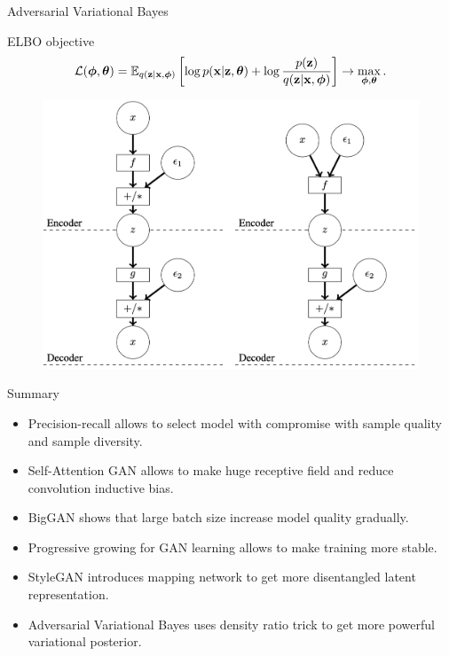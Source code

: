 \begin{frame}{Adversarial Variational Bayes}
	\begin{block}{ELBO objective}
		\vspace{-0.5cm}
		\[
			 \mathcal{L} (\boldsymbol{\phi}, \boldsymbol{\theta})  = \mathbb{E}_{q(\mathbf{z} | \mathbf{x}, \boldsymbol{\phi})} \left[\log p(\mathbf{x} | \mathbf{z}, \boldsymbol{\theta}) + \log \frac{p(\mathbf{z})}{q(\mathbf{z}| \mathbf{x}, \boldsymbol{\phi})} \right] \rightarrow \max_{\boldsymbol{\phi}, \boldsymbol{\theta}}.
		\]	
		\vspace{-0.5cm}
	\end{block}
	\begin{figure}
		\includegraphics[width=0.7\linewidth]{figs/avb_scheme}
	\end{figure}
\end{frame}
\begin{frame}{Summary}
	\begin{itemize}
		\item Precision-recall allows to select model with compromise with sample quality and sample diversity.
		\vfill
		\item Self-Attention GAN allows to make huge receptive field and reduce convolution inductive bias.
		\vfill
		\item BigGAN shows that large batch size increase model quality gradually.
		\item Progressive growing for GAN learning allows to make training more stable.
		\vfill
		\item StyleGAN introduces mapping network to get more disentangled latent representation.
		\vfill
		\item Adversarial Variational Bayes uses density ratio trick to get more powerful variational posterior.
	\end{itemize}
\end{frame}
 